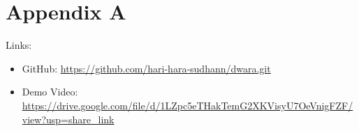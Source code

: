 \chapter*{Appendix A}
Links:
\begin{itemize}
    \item GitHub: \url{https://github.com/hari-hara-sudhann/dwara.git}
    \item Demo Video: \url{https://drive.google.com/file/d/1LZpc5eTHakTemG2XKVisyU7OeVnigFZF/view?usp=share_link}
\end{itemize}